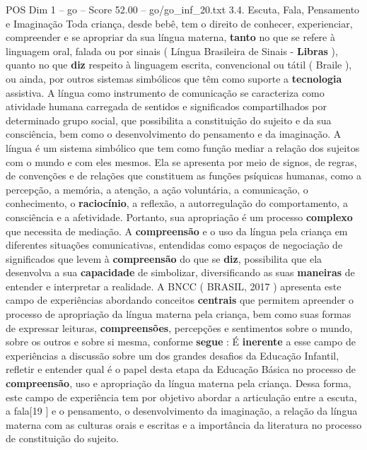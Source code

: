 \begin{textsample}{POS Dim 1 – go – Score 52.00 – go/go\_inf\_20.txt}  \label{ex:f1_pos_096}
3.4.
Escuta, Fala, Pensamento e Imaginação Toda criança, desde bebê, tem o direito de conhecer, experienciar, compreender e se apropriar da sua língua materna, \textbf{tanto} no que se refere à linguagem oral, falada ou por sinais ( Língua Brasileira de Sinais - \textbf{Libras} ), quanto no que \textbf{diz} respeito à linguagem escrita, convencional ou tátil ( Braile ), ou ainda, por outros sistemas simbólicos que têm como suporte a \textbf{tecnologia} assistiva.
A língua como instrumento de comunicação se caracteriza como atividade humana carregada de sentidos e significados compartilhados por determinado grupo social, que possibilita a constituição do sujeito e da sua consciência, bem como o desenvolvimento do pensamento e da imaginação.
A língua é um sistema simbólico que tem como função mediar a relação dos sujeitos com o mundo e com eles mesmos.
Ela se apresenta por meio de signos, de regras, de convenções e de relações que constituem as funções psíquicas humanas, como a percepção, a memória, a atenção, a ação voluntária, a comunicação, o conhecimento, o \textbf{raciocínio}, a reflexão, a autorregulação do comportamento, a consciência e a afetividade.
Portanto, sua apropriação é um processo \textbf{complexo} que necessita de mediação.
A \textbf{compreensão} e o uso da língua pela criança em diferentes situações comunicativas, entendidas como espaços de negociação de significados que levem à \textbf{compreensão} do que se \textbf{diz}, possibilita que ela desenvolva a sua \textbf{capacidade} de simbolizar, diversificando as suas \textbf{maneiras} de entender e interpretar a realidade.
A BNCC ( BRASIL, 2017 ) apresenta este campo de experiências abordando conceitos \textbf{centrais} que permitem apreender o processo de apropriação da língua materna pela criança, bem como suas formas de expressar leituras, \textbf{compreensões}, percepções e sentimentos sobre o mundo, sobre os outros e sobre si mesma, conforme \textbf{segue} : É \textbf{inerente} a esse campo de experiências a discussão sobre um dos grandes desafios da Educação Infantil, refletir e entender qual é o papel desta etapa da Educação Básica no processo de \textbf{compreensão}, uso e apropriação da língua materna pela criança.
Dessa forma, este campo de experiência tem por objetivo abordar a articulação entre a escuta, a fala[19 ] e o pensamento, o desenvolvimento da imaginação, a relação da língua materna com as culturas orais e escritas e a importância da literatura no processo de constituição do sujeito.

\end{textsample}
